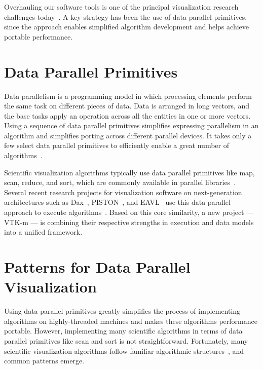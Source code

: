 \documentclass{superfri}
\newcommand*{\lcite}[1]{~\cite{#1}}
\newcommand{\fix}[1]{{\color{red}\textsc{[#1]}}}
\begin{document}
Overhauling our software tools is one of the principal visualization
research challenges today\lcite{Childs2013}.
A key strategy has been the use of 
data parallel primitives, since the approach enables
simplified algorithm development and helps achieve portable performance.


\section{Data Parallel Primitives}

\noindent
Data parallelism is a programming model in which processing elements
perform the same task on different pieces of data. Data is arranged in long
vectors, and the base tasks apply an operation across all the entities in
one or more vectors. Using a sequence of data parallel primitives
simplifies expressing parallelism in an algorithm and simplifies porting
across different parallel devices. It takes only a few select data parallel
primitives to efficiently enable a great number of
algorithms\lcite{Blelloch1990}.

Scientific visualization algorithms typically use data parallel primitives
like map, scan, reduce, and sort, which are commonly available in parallel
libraries\lcite{Thrust,TBB}. Several recent research projects for
visualization software on next-generation architectures such as Dax\lcite{DAX},
PISTON\lcite{PISTON}, and EAVL\lcite{EAVL} use this data parallel approach to execute
algorithms\lcite{Sewell2012}. Based on this core similarity, a new project
--- VTK-m ---
is combining their respective strengths in execution and data models into
a unified framework.




\section{Patterns for Data Parallel Visualization}

\noindent
Using data parallel primitives greatly simplifies the process of
implementing algorithms on highly-threaded machines and makes these
algorithms performance portable. However, implementing many scientific
algorithms in terms of data parallel primitives like scan and sort is not
straightforward. Fortunately, many scientific visualization algorithms
follow familiar algorithmic structures\lcite{Moreland2013:UltraVis}, and
common patterns emerge.
\end{document}
